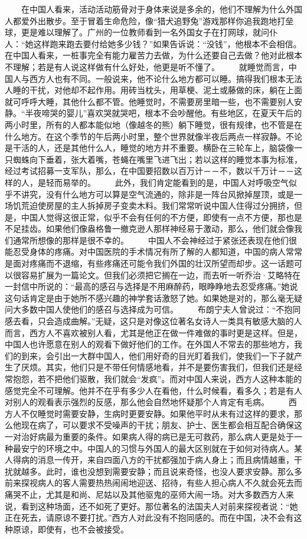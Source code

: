 \documentclass[12pt,oneside]{book}
\begin{document}
\begin{common-format}
　　在中国人看来，活动活动筋骨对于身体来说是多余的，他们不理解为什么外国人都爱外出散步。至于冒着生命危险，像“猎犬追野兔”游戏那样你追我跑地打垒球，更是难以理解了。广州的一位教师看到一名外国女子在打网球，就问仆人：“她这样跑来跑去要付给她多少钱？”如果告诉说：“没钱”，他根本不会相信。在中国人看来，一桩事完全有能力雇苦力去做，为什么还要自己去做？他对此根本不理解；若是有人说这样做有什么好处，他更是听不懂了。 
　　就睡觉而言，中国人与西方人也有不同。一般说来，他不论什么地方都可以睡。搞得我们根本无法人睡的干扰，对他却不起作用。用砖当枕头，用草梗、泥土或藤做的床，躺在上面就可呼呼大睡，其他什么都不管。他睡觉时，不需要房里暗一些，也不需要别人安静。“半夜啼哭的婴儿”喜欢哭就哭吧，根本不会吵醒他。有些地区，在夏天午后的两小时里，所有的人都本能似地（像越冬的熊）躺下睡觉，很有规律，也不管是在什么地方。在这个季节的午后两小时里，整个世界就像半夜后两点一样寂静。不论是干活的人，还是其他什么人，睡觉的地方并不重要。横卧在三轮车上，脑袋像一只蜘蛛向下垂着，张大着嘴，苍蝇在嘴里飞进飞出；若以这样的睡觉本事为标准，经过考试招募一支军队，那么，在中国要招数以百万计－－不，数以千万计－－这样的人，是轻而易举的。 
　　此外，我们肯定能看到的是，中国人对呼吸空气似乎不讲究，没有什么地方可以算是空气流通的，除非是一阵台风掀掉屋顶，或是一场饥荒迫使房屋的主人拆掉房子变卖木料。我们常常听说中国人住得过分拥挤，但是，中国人觉得这很正常，似乎不会有任何的不方便，即使有一点不方便，那也是不足挂齿。如果他们像盎格鲁一撤克逊人那样神经易于激动，那么，他们就会像我们通常所想像的那样是很不幸的。 
　　中国人不会神经过于紧张还表现在他们很能忍受身体的疼痛。对中国医院的手术情况有所了解的人都知道，中国的病人常常是面对疼痛而不退缩，有些疼痛还可能令我们外国的壮汉所望而却步。这一话题可以很容易扩展为一篇论文。但我们必须把它搁在一边，而去听一听乔治·艾略特在一封信中所说的：“最高的感召与选择是不用麻醉药，眼睁睁地去忍受疼痛。”她说这句话肯定是由于她所不感兴趣的神学套话激怒了她。如果她是对的，那么毫无疑问大多数中国人使他们的感召与选择成为可信。 
　　布朗宁夫人曾说过：“不抱同感去看，只会造成曲解。”无疑，这只是对像这位著名女诗人一类具有敏感大脑的人而言，西方人不喜欢被别人看，尤其是他正在做一件难做的事时更是这样。但是，中国人也许愿意在别人的观看下做好他们的工作。在外国人不常去的那些地方，我们的到来，会引出一大群中国人，他们用好奇的目光盯着我们，使我们一下子就产生了厌烦。其实，他们只是不带任何情感地看，并不是要伤害我们，但我们还是经常抱怨，若不把他们驱散，我们就会“发疯”。而对中国人来说，西方人这种本能的感觉完全不可理解。他并不在乎有多少人在看他，什么时候看，看多久；若是有人对别人的观看表示强烈的反感，那么他会自然地怀疑那个人肯定有毛病。 
　　西方人不仅睡觉时需要安静，生病时更要安静。如果他平时从未有过这样的要求，那么他现在病了，可以要求不受噪声的干扰；朋友、护士、医生都会相互配合确保这一对治好病最为重要的条件。如果病人得的病已是无可救药，那么病人更是处于一种最安宁的环境之中。中国人的习惯与外国人的最大区别就在于如何对待病人。某人得病的消息一传开，来自四面八方的干扰都强加于病人身上；而且病情越重，干扰就越多。此时，谁也没想到需要安静；而且说来奇怪，也没人要求安静。那么多前来探视病人的客人需要热热闹闹地迎送、招待，有些人担心病人不久就会死去而痛哭不止，尤其是和尚、尼姑以及其他驱鬼的巫师大闹一场。对大多数西方人来说，看到这种场面，还不如死了更好。那位著名的法国夫人对前来探视者说：“她正在死去，请原谅不要打扰。”西方人对此没有不抱同感的。而在中国，决不会有这种原谅，即使有，也不会被接受。 

\end{common-format}
\end{document}
